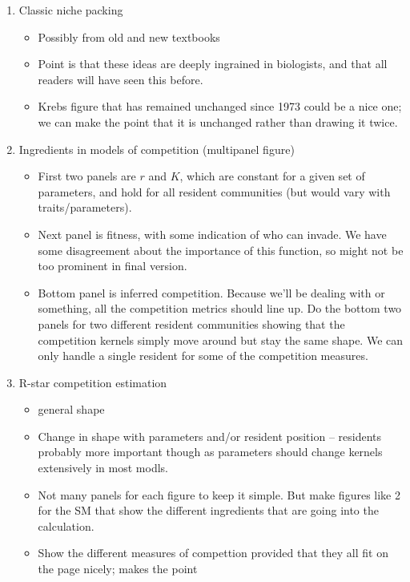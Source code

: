 \documentclass[a4paper,11pt]{article}
\begin{document}
\begin{enumerate}
\item Classic niche packing
  \begin{itemize}
  \item Possibly from old and new textbooks
  \item Point is that these ideas are deeply ingrained in biologists,
    and that all readers will have seen this before.
  \item Krebs figure that has remained unchanged since 1973 could be a
    nice one; we can make the point that it is unchanged rather than
    drawing it twice.
  \end{itemize}
\item Ingredients in models of competition (multipanel figure)
  \begin{itemize}
  \item First two panels are $r$ and $K$, which are constant for a
    given set of parameters, and hold for all resident communities
    (but would vary with traits/parameters).
  \item Next panel is fitness, with some indication of who can
    invade.  We have some disagreement about the importance of this
    function, so might not be too prominent in final version.
  \item Bottom panel is inferred competition.  Because we'll be
    dealing with \citet{Dieckmann-1999} or something, all the
    competition metrics should line up.  Do the bottom two panels for
    two different resident communities showing that the competition
    kernels simply move around but stay the same shape.  We can only
    handle a single resident for some of the competition measures.
  \end{itemize}
\item R-star competition estimation
  \begin{itemize}
  \item general shape
  \item Change in shape with parameters and/or resident position --
    residents probably more important though as parameters should
    change kernels extensively in most modls.
  \item Not many panels for each figure to keep it simple.  But make
    figures like 2 for the SM that show the different ingredients that
    are going into the calculation.
  \item Show the different measures of compettion provided that they
    all fit on the page nicely; \citet{Abrams-2008} makes the point

\end{itemize}
\end{enumerate}
\end{document}
